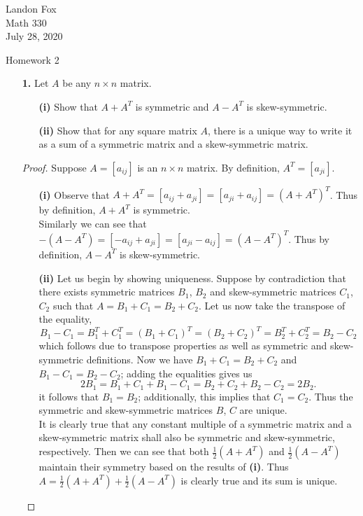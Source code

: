 \documentclass[ 12pt ]{article}
\begin{document}
\noindent Landon Fox \\
\noindent Math 330 \\
\noindent July 28, 2020

\begin{center}
\Large Homework 2
\end{center}

\begin{enumerate}
	\item[\textbf{1.}] Let $A$ be any $n \times n$ matrix.
		\begin{enumerate}
			\item[\textbf{(i)}] Show that $A + A^T$ is symmetric and $A - A^T$ is skew-symmetric.
			\item[\textbf{(ii)}] Show that for any square matrix $A$, there is a unique way to write it as a sum of a symmetric matrix and a skew-symmetric matrix.
		\end{enumerate}

		\begin{proof}
			Suppose $A = [ a_{ij} ]$ is an $n \times n$ matrix. By definition, $A^T = [ a_{ji} ]$.
			\begin{enumerate}
				\item[\textbf{(i)}] Observe that $A + A^T = [ a_{ij} + a_{ji} ] = [ a_{ji} + a_{ij} ] = (A + A^T)^T$. Thus by definition, $A + A^T$ is symmetric. \\
					Similarly we can see that $-(A - A^T) = [ -a_{ij} + a_{ji} ] = [ a_{ji} - a_{ij} ] = (A - A^T)^T$. Thus by definition, $A - A^T$ is skew-symmetric.

				\item[\textbf{(ii)}] Let us begin by showing uniqueness. Suppose by contradiction that there exists symmetric matrices $B_1$, $B_2$ and skew-symmetric matrices
					$C_1$, $C_2$ such that $A = B_1 + C_1 = B_2 + C_2$. Let us now take the transpose of the equality, $$B_1 - C_1 = B_1^T + C_1^T = (B_1 + C_1)^T =
					(B_2 + C_2)^T = B_2^T + C_2^T = B_2 - C_2$$ which follows due to transpose properties as well as symmetric and skew-symmetric definitions. Now we have
					$B_1 + C_1 = B_2 + C_2$ and $B_1 - C_1 = B_2 - C_2$; adding the equalities gives us $$2B_1 = B_1 + C_1 + B_1 - C_1 = B_2 + C_2 + B_2 - C_2 = 2B_2.$$ it
					follows that $B_1 = B_2$; additionally, this implies that $C_1 = C_2$. Thus the symmetric and skew-symmetric matrices $B$, $C$ are unique. \\

					It is clearly true that any constant multiple of a symmetric matrix and a skew-symmetric matrix shall also be symmetric and skew-symmetric, respectively.
					Then we can see that both $\frac{1}{2}(A + A^T)$ and $\frac{1}{2}(A - A^T)$ maintain their symmetry based on the results of \textbf{(i)}. Thus
					$A = \frac{1}{2}(A + A^T) + \frac{1}{2}(A - A^T)$ is clearly true and its sum is unique.
			\end{enumerate}
		\end{proof}



\end{enumerate}
\end{document}
